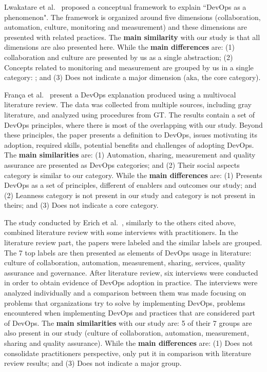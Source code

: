 Lwakatare et al.~\cite{extending_dimensions_icsea_16} proposed a conceptual
framework to explain ``DevOps as a phenomenon". The framework is organized around
five dimensions (collaboration, automation, culture, monitoring and measurement)
and these dimensions are presented with related practices. The \textbf{main similarity}
with our study is that all dimensions are also presented here. While the
\textbf{main differences} are: (1) collaboration and culture are presented by us
as a single abstraction; (2) Concepts related to monitoring and measurement are
grouped by us in a single category: ; and (3) Does
not indicate a major dimension (aka, the core category).

Fran\c{c}a et al.~\cite{characterizing_devops_sbes_2016} present a DevOps
explanation produced using a multivocal literature review. The data was collected
from multiple sources, including gray literature, and analyzed using procedures
from GT. The results contain a set of DevOps principles, where
there is most of the overlapping with our study. Beyond these principles, the paper
presents a definition to DevOps, issues motivating its adoption, required skills,
potential benefits and challenges of adopting DevOps. The \textbf{main similarities}
are: (1) Automation, sharing, measurement and quality assurance are presented as
DevOps categories; and (2) Their social aspects category is similar to our
\cc category. While the \textbf{main differences} are: (1) Presents DevOps as a
set of principles, different of enablers and outcomes our study; and (2) Leanness
category is not present in our study and  category is not present
in theirs; and (3) Does not indicate a core category.

The study conducted by Erich et al.~\cite{qualitative_devops_journalsw_17},
similarly to the others cited above, combined literature review with some
interviews with practitioners. In the literature review part, the papers were
labeled and the similar labels are grouped. The 7 top labels are then presented
as elements of DevOps usage in literature: culture of collaboration, automation,
measurement, sharing, services, quality assurance and governance. After literature
review, six interviews were conducted in order to obtain evidence of DevOps
adoption in practice. The interviews were analyzed individually and a comparison
between them was made focusing on problems that organizations try to solve by
implementing DevOps, problems encountered when implementing DevOps and practices
that are considered part of DevOps. The \textbf{main similarities} with our study
are: 5 of their 7 groups are also present in our study (culture of collaboration,
automation, measurement, sharing and quality assurance). While the \textbf{main
differences} are: (1) Does not consolidate practitioners perspective, only put it
in comparison with literature review results; and (3) Does not indicate a major group.

